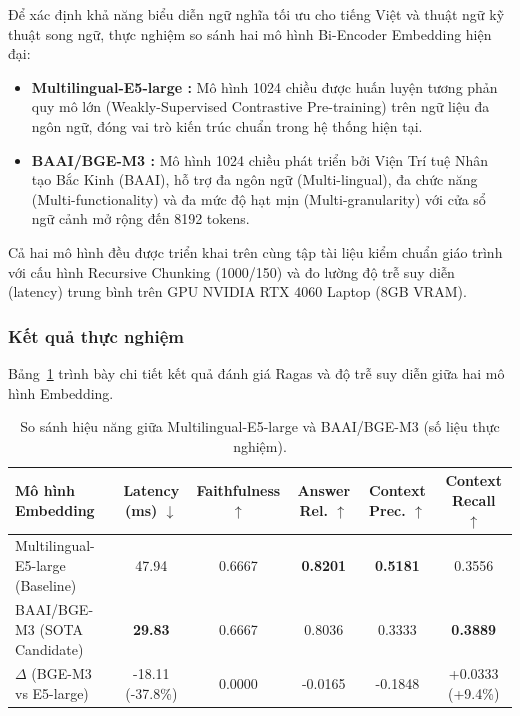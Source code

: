 ﻿\documentclass[12pt]{article}
\begin{document}
Để xác định khả năng biểu diễn ngữ nghĩa tối ưu cho tiếng Việt và thuật ngữ kỹ thuật song ngữ, thực nghiệm so sánh hai mô hình Bi-Encoder Embedding hiện đại:
\begin{itemize}
    \item \textbf{Multilingual-E5-large \cite{wang2024e5}:} Mô hình 1024 chiều được huấn luyện tương phản quy mô lớn (Weakly-Supervised Contrastive Pre-training) trên ngữ liệu đa ngôn ngữ, đóng vai trò kiến trúc chuẩn trong hệ thống hiện tại.
    \item \textbf{BAAI/BGE-M3 \cite{chen2024bge_m3}:} Mô hình 1024 chiều phát triển bởi Viện Trí tuệ Nhân tạo Bắc Kinh (BAAI), hỗ trợ đa ngôn ngữ (Multi-lingual), đa chức năng (Multi-functionality) và đa mức độ hạt mịn (Multi-granularity) với cửa sổ ngữ cảnh mở rộng đến 8192 tokens.
\end{itemize}

Cả hai mô hình đều được triển khai trên cùng tập tài liệu kiểm chuẩn giáo trình với cấu hình Recursive Chunking (1000/150) và đo lường độ trễ suy diễn (latency) trung bình trên GPU NVIDIA RTX 4060 Laptop (8GB VRAM).

\subsubsection{Kết quả thực nghiệm}

Bảng~\ref{tab:exp3_embedding} trình bày chi tiết kết quả đánh giá Ragas và độ trễ suy diễn giữa hai mô hình Embedding.

\begin{table}[H]
\centering
\small
\caption{So sánh hiệu năng giữa Multilingual-E5-large và BAAI/BGE-M3 (số liệu thực nghiệm).}
\label{tab:exp3_embedding}
\begin{tabularx}{\linewidth}{@{}l c c c c c@{}}
\toprule
\textbf{Mô hình Embedding} & \textbf{Latency (ms)} $\downarrow$ & \textbf{Faithfulness} $\uparrow$ & \textbf{Answer Rel.} $\uparrow$ & \textbf{Context Prec.} $\uparrow$ & \textbf{Context Recall} $\uparrow$ \\
\midrule
Multilingual-E5-large (Baseline) & 47.94 & 0.6667 & \textbf{0.8201} & \textbf{0.5181} & 0.3556 \\
BAAI/BGE-M3 (SOTA Candidate)    & \textbf{29.83} & 0.6667 & 0.8036 & 0.3333 & \textbf{0.3889} \\
\addlinespace[3pt]
$\Delta$ (BGE-M3 vs E5-large)    & -18.11 (-37.8\%) & 0.0000 & -0.0165 & -0.1848 & +0.0333 (+9.4\%) \\
\bottomrule
\end{tabularx}
\par\smallskip
\end{table}
\end{document}

